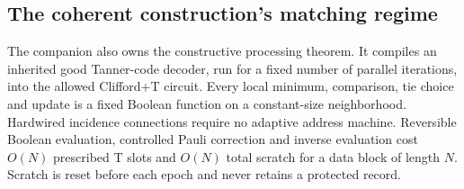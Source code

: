 \documentclass[11pt,a4paper]{article}
\begin{document}
\subsection{The coherent construction's matching regime}
The companion also owns the constructive processing theorem. It compiles an inherited good Tanner-code decoder, run for a fixed number of parallel iterations, into the allowed Clifford+T circuit. Every local minimum, comparison, tie choice and update is a fixed Boolean function on a constant-size neighborhood. Hardwired incidence connections require no adaptive address machine. Reversible Boolean evaluation, controlled Pauli correction and inverse evaluation cost $O(N)$ prescribed T slots and $O(N)$ total scratch for a data block of length $N$. Scratch is reset before each epoch and never retains a protected record.
\end{document}

